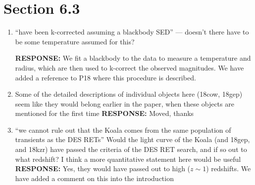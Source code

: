 \documentclass{article}
\begin{document}
 \section*{Section 6.3}
 \begin{enumerate}
 \item “have been k-corrected assuming a blackbody SED” — doesn’t there have to be some temperature assumed for this?
 
  \vskip0.1cm
 {\bf RESPONSE: } We fit a blackbody to the data to measure a temperature and radius, which are then used to k-correct the observed magnitudes. We have added a reference to P18 where this procedure is described.
 
 \item Some of the detailed descriptions of individual objects here (18cow, 18gep) seem like they would
belong earlier in the paper, when these objects are mentioned for the first time
\vskip0.1cm
 {\bf RESPONSE: } Moved, thanks
 
 \item “we cannot rule out that the Koala comes from the same population of transients as the DES RETs” Would the light curve of the Koala (and 18gep, and 18kzr) have passed the criteria of the DES RET search, and if so out to what redshift? I think a more quantitative statement here would be useful
 \vskip0.1cm
 {\bf RESPONSE: } Yes, they would have passed out to high ($z\sim1$) redshifts. We have added a comment on this into the introduction
 
\end{enumerate}
\end{document}
